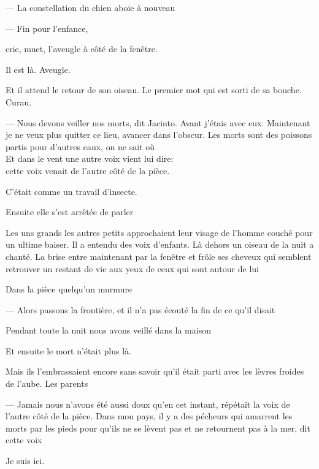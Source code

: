 --- La constellation du chien aboie à nouveau

\pagebreak

\vspace*{4cm}

--- Fin pour l'enfance,

crie, muet, l'aveugle à côté de la fenêtre.

Il est là. Aveugle.

Et il attend le retour de son oiseau. Le premier mot qui est sorti de sa
bouche. Curau.

--- Nous devons veiller nos morts, dit Jacinto. Avant j'étais avec eux.
Maintenant je ne veux plus quitter ce lieu, avancer dans l'obscur. Les
morts sont des poissons partis pour d'autres eaux, on ne sait où\\

Et dans le vent une autre voix vient lui dire:\\

cette voix venait de l'autre côté de la pièce.

C'était comme un travail d'insecte.

Ensuite elle s'est arrêtée de parler

Les uns grands les autres petits approchaient leur visage de l'homme
couché pour un ultime baiser. Il a entendu des voix d'enfants. Là dehors
un oiseau de la nuit a chanté. La brise entre maintenant par la fenêtre
et frôle ses cheveux qui semblent retrouver un restant de vie aux yeux
de ceux qui sont autour de lui

Dans la pièce quelqu'un murmure

--- Alors passons la frontière, et il n'a pas écouté la fin de ce qu'il
disait

Pendant toute la nuit nous avons veillé dans la maison

Et ensuite le mort n'était plus là.

Mais ils l'embrassaient encore sans savoir qu'il était parti avec les
lèvres froides de l'aube. Les parents

--- Jamais nous n'avons été aussi doux qu'en cet instant, répétait la voix
de l'autre côté de la pièce. Dans mon pays, il y a des pécheurs qui
amarrent les morts par les pieds pour qu'ils ne se lèvent pas et ne
retournent pas à la mer, dit cette voix

\pagebreak

\vspace*{4cm}

Je suis ici.

